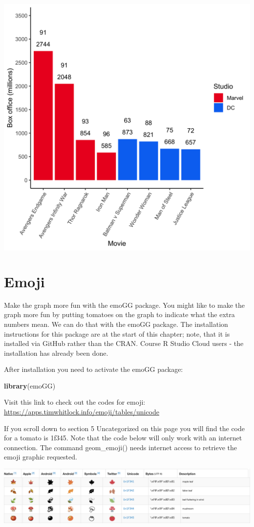 \documentclass[
]{krantz}
\makeatletter
\newenvironment{Shaded}{\begin{snugshade}}{\end{snugshade}}
\newcommand{\KeywordTok}[1]{\textcolor[rgb]{0.27,0.27,0.27}{\textbf{#1}}}
\newcommand{\NormalTok}[1]{#1}
\newenvironment{kframe}{%
\medskip{}
\setlength{\fboxsep}{.8em}
 \def\at@end@of@kframe{}%
 \ifinner\ifhmode%
  \def\at@end@of@kframe{\end{minipage}}%
  \begin{minipage}{\columnwidth}%
 \fi\fi%
 \def\FrameCommand##1{\hskip\@totalleftmargin \hskip-\fboxsep
 \colorbox{shadecolor}{##1}\hskip-\fboxsep
     \hskip-\linewidth \hskip-\@totalleftmargin \hskip\columnwidth}%
 \MakeFramed {\advance\hsize-\width
   \@totalleftmargin\z@ \linewidth\hsize
   \@setminipage}}%
 {\par\unskip\endMakeFramed%
 \at@end@of@kframe}
\renewenvironment{Shaded}{\begin{kframe}}{\end{kframe}}
\makeatother
\begin{document}
\includegraphics[width=0.65\linewidth]{ch_graphing/images/logo_color_graph}

\hypertarget{emoji}{%
\section{Emoji}\label{emoji}}

Make the graph more fun with the emoGG package. You might like to make the graph more fun by putting tomatoes on the graph to indicate what the extra numbers mean. We can do that with the emoGG package. The installation instructions for this package are at the start of this chapter; note, that it is installed via GitHub rather than the CRAN. Course R Studio Cloud users - the installation has already been done.

After installation you need to activate the emoGG package:

\begin{Shaded}
\begin{Highlighting}[]
\KeywordTok{library}\NormalTok{(emoGG)}
\end{Highlighting}
\end{Shaded}

Visit this link to check out the codes for emoji: \url{https://apps.timwhitlock.info/emoji/tables/unicode}

If you scroll down to section 5 Uncategorized on this page you will find the code for a tomato is 1f345. Note that the code below will only work with an internet connection. The command geom\_emoji() needs internet access to retrieve the emoji graphic requested.

\includegraphics[width=0.9\linewidth]{ch_graphing/images/emoji_table}
\end{document}
